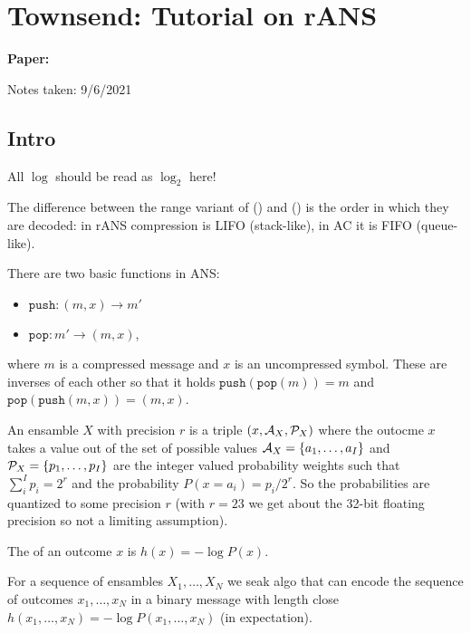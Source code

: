 \clearpage

\section{Townsend: Tutorial on rANS}\label{sec:rANS}

\begin{notebox}
\textbf{Paper: } 

\hfill Notes taken: 9/6/2021 
\end{notebox}

\subsection{Intro}\label{sec:rANS_Intro}

\begin{notebox}[colback=yellow!5]
All $\log$ should be read as $\log_2$ here!
\end{notebox}

The difference between the range variant of  () and  () is the order in which they are decoded: in rANS compression is LIFO (stack-like), in AC it is FIFO (queue-like).

There are two basic functions in ANS:
\begin{itemize}[nosep]
\item $\mathtt{push}: (m, x) \to m'$
\item $\mathtt{pop}: m' \to (m, x)$,
\end{itemize}
where $m$ is a compressed message and $x$ is an uncompressed symbol.
These are inverses of each other so that it holds $\mathtt{push}(\mathtt{pop}(m))=m$ and $\mathtt{pop}(\mathtt{push}(m, x))=(m, x)$.

An ensamble $X$ with precision $r$ is a triple $(x, {\mathcal{A}}_X, {\mathcal{P}}_X)$ where the outocme $x$ takes a value out of the set of possible values ${\mathcal{A}}_X = \{a_1, \ldots, a_I\}$ and ${\mathcal{P}}_X = \{p_1, \ldots, p_I\}$ are the integer valued probability weights such that $\sum_i^I p_i = 2^r$ and the probability $P(x = a_i) = p_i / 2^r$.
So the probabilities are quantized to some precision $r$ (with $r=23$ we get about the 32-bit floating precision so not a limiting assumption).

The  of an outcome $x$ is $h(x) = -\log P(x)$.

For a sequence of ensambles $X_1, \ldots, X_N$ we seak algo that can encode the sequence of outcomes $x_1, \ldots, x_N$ in a binary message with length close $h(x_1, \ldots, x_N) = - \log P(x_1, \ldots, x_N)$ (in expectation).

